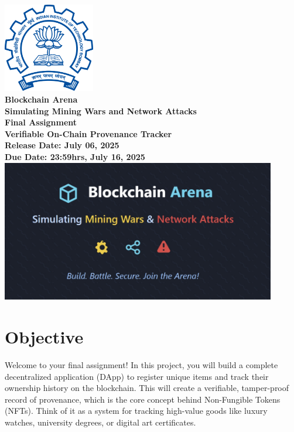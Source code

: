 \documentclass[12pt]{extarticle}
\begin{document}
\begin{titlepage}
    \begin{center}
        \includegraphics[width=0.3\textwidth]{iitb_logo.png}\\[1.5cm]
        {\LARGE \bfseries Blockchain Arena}\\
        \vspace{0.5cm}
        {\Large \bfseries Simulating Mining Wars and Network Attacks}\\
        \vspace{1cm}
        {\LARGE \bfseries Final Assignment}\\
        \vspace{0.5cm}
        {\Large \bfseries Verifiable On-Chain Provenance Tracker}\\
        \vspace{1.5cm}
        {\Large \bf Release Date: July 06, 2025}\\
        \vspace{0.5cm}
        {\Large \bf Due Date: 23:59hrs, July 16, 2025}\\
        \vspace{3cm}
        \includegraphics[width=0.9\textwidth]{blockchain_arena.jpeg}\\[1.5cm]
    \end{center}
\end{titlepage}

\vspace{1cm}

\section*{Objective}
Welcome to your final assignment! In this project, you will build a complete decentralized application (DApp) to register unique items and track their ownership history on the blockchain. This will create a verifiable, tamper-proof record of provenance, which is the core concept behind Non-Fungible Tokens (NFTs). Think of it as a system for tracking high-value goods like luxury watches, university degrees, or digital art certificates.
\end{document}
